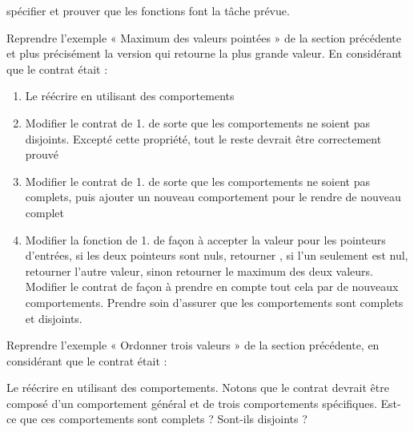 spécifier et prouver que les fonctions font la tâche prévue.




Reprendre l'exemple « Maximum des valeurs pointées » de la section
précédente et plus précisément la version qui retourne la plus grande
valeur. En considérant que le contrat était :




\begin{enumerate}
\item Le réécrire en utilisant des comportements
\item Modifier le contrat de 1. de sorte que les comportements ne
  soient pas disjoints. Excepté cette propriété, tout le reste devrait
  être correctement prouvé
\item Modifier le contrat de 1. de sorte que les comportements ne
  soient pas complets, puis ajouter un nouveau comportement pour le
  rendre de nouveau complet
\item Modifier la fonction de 1. de façon à accepter la valeur
   pour les pointeurs d'entrées, si les deux pointeurs
  sont nuls, retourner  , si l'un seulement est
  nul, retourner l'autre valeur, sinon retourner le maximum des deux
  valeurs. Modifier le contrat de façon à prendre en compte tout cela
  par de nouveaux comportements. Prendre soin d'assurer que les comportements
  sont complets et disjoints.
\end{enumerate}





Reprendre l'exemple « Ordonner trois valeurs » de la section
précédente, en considérant que le contrat était :




Le réécrire en utilisant des comportements. Notons que le contrat
devrait être composé d'un comportement général et de trois
comportements spécifiques. Est-ce que ces comportements sont complets ?
Sont-ils disjoints ?
